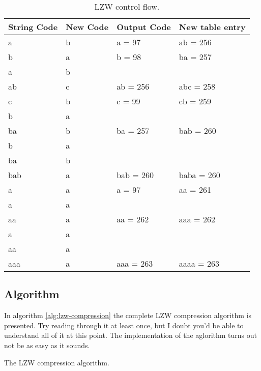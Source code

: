 \begin{refsection}
\begin{table}
  \centering
  \newcommand{\lzwrow}[4]{#1 & #2 & #3 & #4 \\}
  \begin{tabular}{llll}
    \toprule
    String Code & New Code & Output Code & New table entry \\
    \midrule

    \lzwrow{a}{b}{a = 97}{ab = 256}
    \lzwrow{b}{a}{b = 98}{ba = 257}
    \lzwrow{a}{b}{}{}
    \lzwrow{ab}{c}{ab = 256}{abc = 258}
    \lzwrow{c}{b}{c = 99}{cb = 259}
    \lzwrow{b}{a}{}{}
    \lzwrow{ba}{b}{ba = 257}{bab = 260}
    \lzwrow{b}{a}{}{}
    \lzwrow{ba}{b}{}{}
    \lzwrow{bab}{a}{bab = 260}{baba = 260}
    \lzwrow{a}{a}{a = 97}{aa = 261}
    \lzwrow{a}{a}{}{}
    \lzwrow{aa}{a}{aa = 262}{aaa = 262}
    \lzwrow{a}{a}{}{}
    \lzwrow{aa}{a}{}{}
    \lzwrow{aaa}{a}{aaa = 263}{aaaa = 263}

    \bottomrule
  \end{tabular}
  \caption{LZW control flow.}
  \label{tab:lzw-walkthru}
\end{table}

\subsection{Algorithm}

In algorithm \ref{alg:lzw-compression} the complete LZW compression
algorithm is presented. Try reading through it at least once,
but I doubt you'd be able to understand all of it at this point. The
implementation of the aglorithm turns out not be as easy as it
sounds.

\begin{algorithm}[H]
  \caption{The LZW compression algorithm.}
  \label{alg:lzw-compression}
  \begin{algorithmic}[1]

    \While{\neof}

       \label{algl:hasingcheckintable}
         \label{algl:hasgetcode}
      \Else
        \State {}


          \State {}\label{algl:hashadd}


\end{algorithmic}
\end{algorithm}
\end{refsection}
